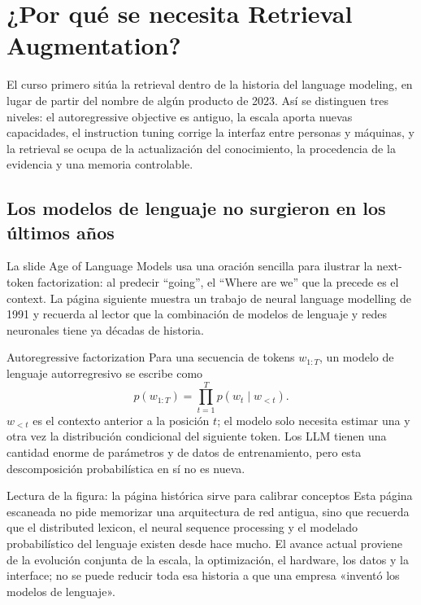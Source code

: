 \section{¿Por qué se necesita Retrieval Augmentation?}

El curso primero sitúa la retrieval dentro de la historia del language modeling, en lugar de partir del nombre de algún producto de 2023. Así se distinguen tres niveles: el autoregressive objective es antiguo, la escala aporta nuevas capacidades, el instruction tuning corrige la interfaz entre personas y máquinas, y la retrieval se ocupa de la actualización del conocimiento, la procedencia de la evidencia y una memoria controlable.

\subsection{Los modelos de lenguaje no surgieron en los últimos años}

La slide Age of Language Models usa una oración sencilla para ilustrar la next-token factorization: al predecir ``going'', el ``Where are we'' que la precede es el context. La página siguiente muestra un trabajo de neural language modelling de 1991 y recuerda al lector que la combinación de modelos de lenguaje y redes neuronales tiene ya décadas de historia.


\begin{importantbox}{Autoregressive factorization}
Para una secuencia de tokens $w_{1:T}$, un modelo de lenguaje autorregresivo se escribe como
\[
p(w_{1:T})=\prod_{t=1}^{T}p(w_t\mid w_{<t}).
\]
$w_{<t}$ es el contexto anterior a la posición $t$; el modelo solo necesita estimar una y otra vez la distribución condicional del siguiente token. Los LLM tienen una cantidad enorme de parámetros y de datos de entrenamiento, pero esta descomposición probabilística en sí no es nueva.
\end{importantbox}


\begin{knowledgebox}{Lectura de la figura: la página histórica sirve para calibrar conceptos}
Esta página escaneada no pide memorizar una arquitectura de red antigua, sino que recuerda que el distributed lexicon, el neural sequence processing y el modelado probabilístico del lenguaje existen desde hace mucho. El avance actual proviene de la evolución conjunta de la escala, la optimización, el hardware, los datos y la interface; no se puede reducir toda esa historia a que una empresa «inventó los modelos de lenguaje».
\end{knowledgebox}

